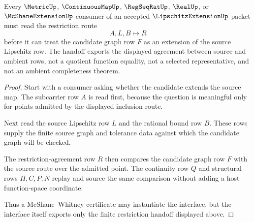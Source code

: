 \begin{theorem}
\label{thm:lipschitz-extension-restriction-handoff}
Every $\MetricUp$, $\ContinuousMapUp$, $\RegSeqRatUp$, $\RealUp$, or $\McShaneExtensionUp$ consumer of an accepted $\LipschitzExtensionUp$ packet must read the restriction route
$$
A,L,B \longmapsto R
$$
before it can treat the candidate graph row $F$ as an extension of the source Lipschitz row. The handoff exports the displayed agreement between source and ambient rows, not a quotient function equality, not a selected representative, and not an ambient completeness theorem.
\end{theorem}
\begin{proof}
Start with a consumer asking whether the candidate extends the source map. The subcarrier row $A$ is read first, because the question is meaningful only for points admitted by the displayed inclusion route.

Next read the source Lipschitz row $L$ and the rational bound row $B$. These rows supply the finite source graph and tolerance data against which the candidate graph will be checked.

The restriction-agreement row $R$ then compares the candidate graph row $F$ with the source route over the admitted point. The continuity row $Q$ and structural rows $H,C,P,N$ replay and source the same comparison without adding a host function-space coordinate.

Thus a McShane--Whitney certificate may instantiate the interface, but the interface itself exports only the finite restriction handoff displayed above.
\end{proof}


\begin{closurestatus}{\LipschitzExtensionUp}
  \theoryclosure{\seedClosure}
  \formalstatus{\unformalizedV}
\end{closurestatus}
